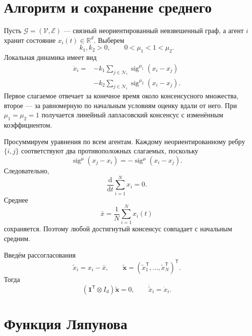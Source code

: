 \section{Алгоритм и сохранение среднего}

Пусть \(\mathcal G=(\mathcal V,\mathcal E)\) --- связный
неориентированный невзвешенный граф, а агент \(i\) хранит состояние
\(x_i(t)\in\mathbb R^d\). Выберем
\[
    k_1,k_2>0,
    \qquad
    0<\mu_1<1<\mu_2.
\]
Локальная динамика имеет вид
\[
\begin{aligned}
    \dot x_i
    ={}&
    -k_1
    \sum_{j\in\mathcal N_i}
    \operatorname{sig}^{\mu_1}(x_i-x_j)
    \\
    &-
    k_2
    \sum_{j\in\mathcal N_i}
    \operatorname{sig}^{\mu_2}(x_i-x_j).
\end{aligned}
\]
Первое слагаемое отвечает за конечное время около консенсусного
множества, второе --- за равномерную по начальным условиям оценку
вдали от него. При \(\mu_1=\mu_2=1\) получается линейный
лапласовский консенсус с изменённым коэффициентом.

Просуммируем уравнения по всем агентам. Каждому неориентированному
ребру \(\{i,j\}\) соответствуют два противоположных слагаемых,
поскольку
\[
    \operatorname{sig}^{\mu}(x_j-x_i)
    =
    -\operatorname{sig}^{\mu}(x_i-x_j).
\]
Следовательно,
\[
    \frac{\mathrm d}{\mathrm dt}
    \sum_{i=1}^{N}x_i=0.
\]
Среднее
\[
    \bar x
    =
    \frac1N\sum_{i=1}^{N}x_i(t)
\]
сохраняется. Поэтому любой достигнутый консенсус совпадает с
начальным средним.

Введём рассогласования
\[
    \widetilde x_i=x_i-\bar x,
    \qquad
    \widetilde{\mathbf x}
    =
    (\widetilde x_1^{\mathsf T},\ldots,
      \widetilde x_N^{\mathsf T})^{\mathsf T}.
\]
Тогда
\[
    (\mathbf1^{\mathsf T}\otimes I_d)
    \widetilde{\mathbf x}=0,
    \qquad
    \dot{\widetilde x}_i=\dot x_i.
\]

\section{Функция Ляпунова}

